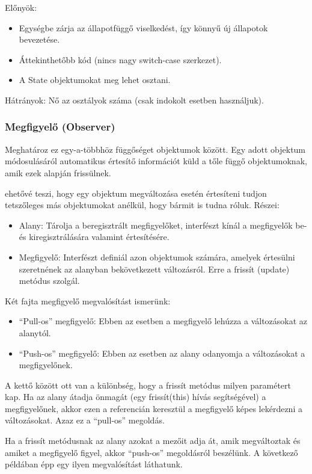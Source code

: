 \documentclass[margin=0px]{article}
\begin{document}
Előnyök:
\begin{itemize}
    \item Egységbe zárja az állapotfüggő viselkedést, így könnyű új állapotok bevezetése.
    \item Áttekinthetőbb kód (nincs nagy switch-case szerkezet).
    \item A State objektumokat meg lehet osztani.
\end{itemize}

Hátrányok: Nő az osztályok száma (csak indokolt esetben használjuk).

\subsubsection{Megfigyelő (Observer)}
Meghatároz ez egy-a-többhöz függőséget objektumok között. Egy adott objektum módosulásáról automatikus értesítő információt küld a tőle függő objektumoknak, amik ezek alapján frissülnek.

ehetővé teszi, hogy egy objektum megváltozása esetén értesíteni tudjon tetszőleges más objektumokat anélkül, hogy bármit is tudna róluk. Részei:
\begin{itemize}
    \item Alany: Tárolja a beregisztrált megfigyelőket, interfészt kínál a megfigyelők be- és kiregisztrálására valamint értesítésére.
    \item Megfigyelő: Interfészt definiál azon objektumok számára, amelyek értesülni szeretnének az alanyban bekövetkezett változásról. Erre a frissít (update) metódus szolgál.
\end{itemize}

Két fajta megfigyelő megvalósítást ismerünk:
\begin{itemize}
    \item ``Pull-os'' megfigyelő: Ebben az esetben a megfigyelő lehúzza a változásokat az alanytól.
    \item ``Push-os'' megfigyelő: Ebben az esetben az alany odanyomja a változásokat a megfigyelőnek.
\end{itemize}

A kettő között ott van a különbség, hogy a frissít metódus milyen paramétert kap. Ha az alany átadja önmagát (egy frissít(this) hívás segítségével) a megfigyelőnek, akkor ezen a referencián keresztül a megfigyelő képes lekérdezni a változásokat. Azaz ez a ``pull-os'' megoldás.

Ha a frissít metódusnak az alany azokat a mezőit adja át, amik megváltoztak és amiket a megfigyelő figyel, akkor ``push-os'' megoldásról beszélünk. A következő példában épp egy ilyen megvalósítást láthatunk.
\end{document}
